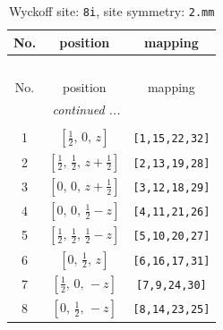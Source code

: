 \documentclass[fleqn,8pt]{jsarticle}
\begin{document}
\begin{longtable}{ccc}
\caption{Wyckoff site: {\tt 8i}, site symmetry: {\tt 2.mm}}
 \\
 \hline \hline
No. & position & mapping \\ \hline \endfirsthead

\multicolumn{2}{l}{\tablename\ \thetable{}} \\
 \hline \hline
No. & position & mapping \\ \hline \endhead

 \hline \hline
\multicolumn{2}{r}{\footnotesize\it continued ...} \\ \endfoot

 \hline \hline
\multicolumn{2}{r}{} \\ \endlastfoot

1 & $\left[ \frac{1}{2},\, 0,\, z \right]$ & {\tt [1,15,22,32]} \\ \hline
2 & $\left[ \frac{1}{2},\, \frac{1}{2},\, z + \frac{1}{2} \right]$ & {\tt [2,13,19,28]} \\ \hline
3 & $\left[ 0,\, 0,\, z + \frac{1}{2} \right]$ & {\tt [3,12,18,29]} \\ \hline
4 & $\left[ 0,\, 0,\, \frac{1}{2} - z \right]$ & {\tt [4,11,21,26]} \\ \hline
5 & $\left[ \frac{1}{2},\, \frac{1}{2},\, \frac{1}{2} - z \right]$ & {\tt [5,10,20,27]} \\ \hline
6 & $\left[ 0,\, \frac{1}{2},\, z \right]$ & {\tt [6,16,17,31]} \\ \hline
7 & $\left[ \frac{1}{2},\, 0,\, - z \right]$ & {\tt [7,9,24,30]} \\ \hline
8 & $\left[ 0,\, \frac{1}{2},\, - z \right]$ & {\tt [8,14,23,25]} \\
\end{longtable}
\renewcommand{\arraystretch}{1.2}
\end{document}
